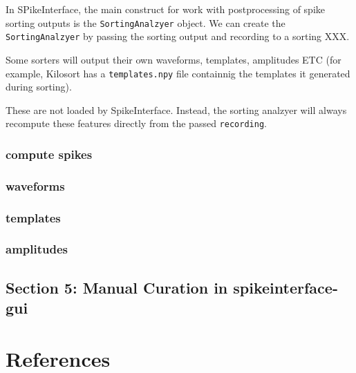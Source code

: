 \documentclass[
  letterpaper,
  DIV=11,
  numbers=noendperiod]{scrreprt}
\begin{document}
In SPikeInterface, the main construct for work with postprocessing of
spike sorting outputs is the \texttt{SortingAnalzyer} object. We can
create the \texttt{SortingAnalzyer} by passing the sorting output and
recording to a sorting XXX.

Some sorters will output their own waveforms, templates, amplitudes ETC
(for example, Kilosort has a \texttt{templates.npy} file containnig the
templates it generated during sorting).

These are not loaded by SpikeInterface. Instead, the sorting analzyer
will always recompute these features directly from the passed
\texttt{recording}.

\subsection*{compute spikes}\label{compute-spikes}

\subsection*{waveforms}\label{waveforms}

\subsection*{templates}\label{templates}

\subsection*{amplitudes}\label{amplitudes}

\section*{Section 5: Manual Curation in
spikeinterface-gui}\label{section-5-manual-curation-in-spikeinterface-gui}



\chapter*{References}\label{references}


\protect{}\label{refs}
\end{document}
